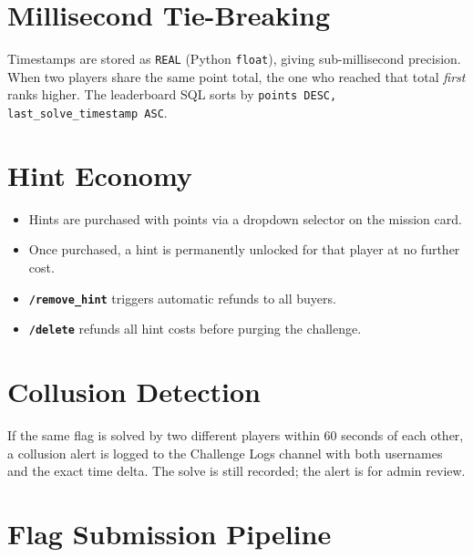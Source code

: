 \documentclass[12pt,a4paper]{report}
\newcommand{\cmd}[1]{\texttt{\color{cybercyan}\textbf{#1}}}
\begin{document}
\section{Millisecond Tie-Breaking}

Timestamps are stored as \texttt{REAL} (Python \texttt{float}), giving sub-millisecond precision.
When two players share the same point total, the one who reached that total \textit{first} ranks
higher. The leaderboard SQL sorts by \texttt{points DESC, last\_solve\_timestamp ASC}.

\section{Hint Economy}

\begin{itemize}
    \item Hints are purchased with points via a dropdown selector on the mission card.
    \item Once purchased, a hint is permanently unlocked for that player at no further cost.
    \item \cmd{/remove\_hint} triggers automatic refunds to all buyers.
    \item \cmd{/delete} refunds all hint costs before purging the challenge.
\end{itemize}

\section{Collusion Detection}

If the same flag is solved by two different players within 60 seconds of each other, a collusion
alert is logged to the Challenge Logs channel with both usernames and the exact time delta. The
solve is still recorded; the alert is for admin review.

\newpage
\section{Flag Submission Pipeline}
\end{document}

